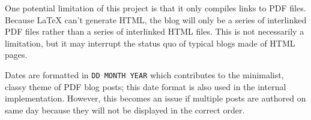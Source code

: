 
  One potential limitation of this project is that it only compiles links to PDF files. Because LaTeX can't generate HTML, the blog will only be a series of interlinked PDF files rather than a series of interlinked HTML files. This is not necessarily a limitation, but it may interrupt the status quo of typical blogs made of HTML pages. 


  Dates are formatted in \texttt{DD MONTH YEAR} which contributes to the minimalist, classy theme of PDF blog posts; this date format is also used in the internal implementation. However, this becomes an issue if multiple posts are authored on same day because they will not be displayed in the correct order. 